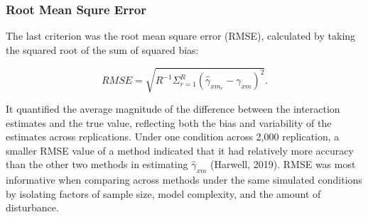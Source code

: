 \documentclass[
  man]{apa7}
\begin{document}
\hypertarget{root-mean-squre-error}{%
\subsubsection{Root Mean Squre Error}\label{root-mean-squre-error}}

The last criterion was the root mean square error (RMSE), calculated by taking the squared root of the sum of squared bias:

\begin{equation}
RMSE = \sqrt{R^{-1}\Sigma^{R}_{r = 1}(\hat{\gamma}_{xm_{r}} - \gamma_{xm})^2}.
\end{equation}

It quantified the average magnitude of the difference between the interaction estimates and the true value, reflecting both the bias and variability of the estimates across replications. Under one condition across 2,000 replication, a smaller RMSE value of a method indicated that it had relatively more accuracy than the other two methods in estimating \(\hat{\gamma}_{xm}\) (Harwell, 2019). RMSE was most informative when comparing across methods under the same simulated conditions by isolating factors of sample size, model complexity, and the amount of disturbance.
\end{document}
